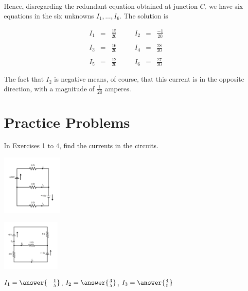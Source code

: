\documentclass{ximera}
\begin{document}
\begin{example}
\begin{explanation}
Hence, disregarding the redundant equation obtained at junction $C$, we have six equations in the six unknowns $I_1, \dots, I_6$. The solution is

$$\begin{array}{ccccccc}
I_1& =& \frac{15}{20}&\quad& I_2 &=& \frac{-1}{20}\\
&&&&&&\\
I_3& =& \frac{16}{20}&\quad& I_4 &=& \frac{28}{20}\\
&&&&&&\\
I_5 &=& \frac{12}{20}&\quad&I_6 &=& \frac{27}{20}
\end{array}$$

The fact that $I_2$ is negative means, of course, that this current is in the opposite direction, with a magnitude of $\frac{1}{20}$ amperes.

\end{explanation}

\end{example}

\section*{Practice Problems}

In Exercises 1 to 4, find the currents in the circuits.

\begin{problem}\label{prob:circuit1}
\begin{image}
   
\includegraphics[height=1.2in]{circuit2.jpg}~
 
\end{image}
\end{problem}

\begin{problem}\label{prob:circuit2}

\begin{image}
   
\includegraphics[height=1in]{circuit3.jpg}~
 
\end{image}


$ I_1 = \answer{-\frac{1}{5}}$, $I_2 = \answer{\frac{3}{5}}$, $I_3 = \answer{\frac{4}{5}}$


\end{problem}
\end{document}
